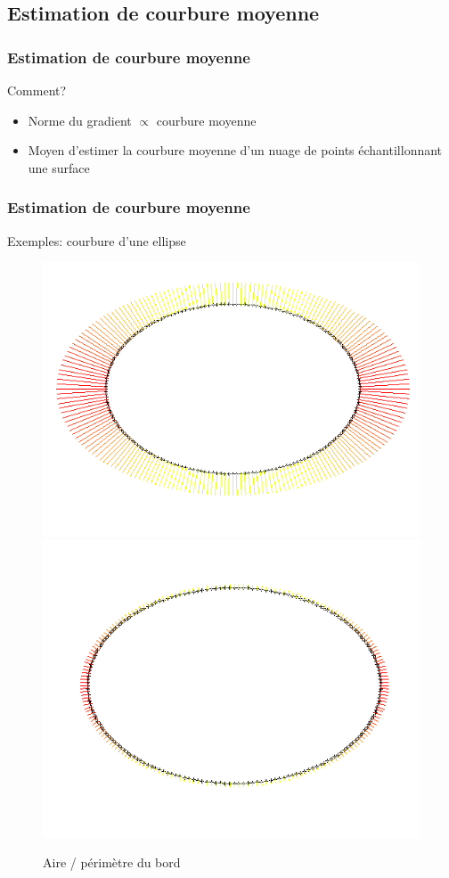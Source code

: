 \documentclass{beamer}
\begin{document}
\subsection{Estimation de courbure moyenne}
\begin{frame}
    \frametitle{Estimation de courbure moyenne}

    Comment?
    \begin{itemize}
        \item Norme du gradient $ \propto $ courbure moyenne
        \item Moyen d'estimer la courbure moyenne d'un nuage de points
            échantillonnant une surface
    \end{itemize}
\end{frame}

\begin{frame}
    \frametitle{Estimation de courbure moyenne}

    Exemples: courbure d'une ellipse
    \begin{figure}
        \centering
        \includegraphics[scale=0.3]{img/curvature-ellipse-200-15-area}
        \includegraphics[scale=0.3]{img/curvature-ellipse-200-15-perimeter}
        \caption{Aire / périmètre du bord}
    \end{figure}
\end{frame}
\end{document}
